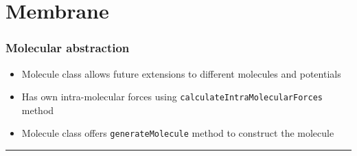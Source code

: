 \section{Membrane}
\label{sec:membrane}

\begin{frame}
    \frametitle{Molecular abstraction}
    
    \begin{itemize}
        \item Molecule class allows future extensions to different molecules and potentials
        \item Has own intra-molecular forces using \texttt{calculateIntraMolecularForces} method
        \item Molecule class offers \texttt{generateMolecule} method to construct the molecule
    \end{itemize}

    \vspace{7pt}
    \hrule


\end{frame}
